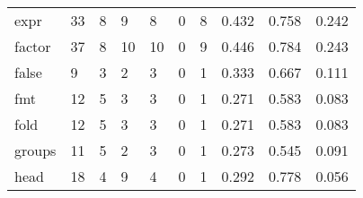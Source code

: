 \begin{longtable}{lp{1.3cm}p{1.3cm}p{1.3cm}p{1.3cm}p{1.3cm}p{1.3cm}p{1.3cm}p{1.3cm}p{1.3cm}}
expr      &                     33 &                                             8 &                                            9 &                                           8 &                                            0 &                                          8 &                                0.432 &                                  0.758 &                                0.242 \\
factor    &                     37 &                                             8 &                                           10 &                                          10 &                                            0 &                                          9 &                                0.446 &                                  0.784 &                                0.243 \\
false     &                      9 &                                             3 &                                            2 &                                           3 &                                            0 &                                          1 &                                0.333 &                                  0.667 &                                0.111 \\
fmt       &                     12 &                                             5 &                                            3 &                                           3 &                                            0 &                                          1 &                                0.271 &                                  0.583 &                                0.083 \\
fold      &                     12 &                                             5 &                                            3 &                                           3 &                                            0 &                                          1 &                                0.271 &                                  0.583 &                                0.083 \\
groups    &                     11 &                                             5 &                                            2 &                                           3 &                                            0 &                                          1 &                                0.273 &                                  0.545 &                                0.091 \\
head      &                     18 &                                             4 &                                            9 &                                           4 &                                            0 &                                          1 &                                0.292 &                                  0.778 &                                0.056 \\

\end{longtable}
